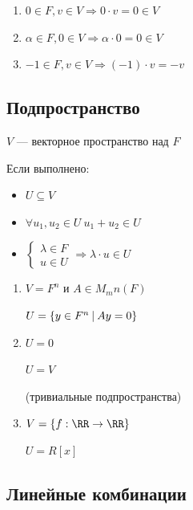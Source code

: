 \begin{remark}{}{}
    \begin{enumerate}
        \item
            \( 0 \in F, v \in V \Rightarrow 0 \cdot v = 0 \in V \)
        \item
            \( \alpha \in F, 0 \in V \Rightarrow \alpha \cdot 0 = 0 \in V \)
        \item
            \( -1 \in F, v \in V \Rightarrow (-1) \cdot v = -v \)
    \end{enumerate}
\end{remark}

\subsection{Подпространство}

\( V \) --- векторное пространство над \( F \)

Если выполнено:
\begin{itemize}
    \item
        \( U \subseteq V \)
    \item
        \( \forall u_1, u_2 \in U \ u_1 + u_2 \in U \)
    \item
        \(
            \begin{cases}
                \lambda \in F
                \\
                u \in U
            \end{cases}
            \Rightarrow
            \lambda \cdot u \in U
        \)
\end{itemize}

\begin{example}{}{}
    \begin{enumerate}
        \item
            \( V = F^n \) и \( A \in M_mn(F) \)

            \( U = \{ y \in F^n \ \vline \ Ay = 0 \} \)
        \item
            \( U = 0 \)

            \( U = V \)

            (тривиальные подпространства)
        \item
            \( V = \{ f : \RR \to \RR \} \)

            \( U = R[x] \)
    \end{enumerate}
\end{example}

\subsection{Линейные комбинации}

